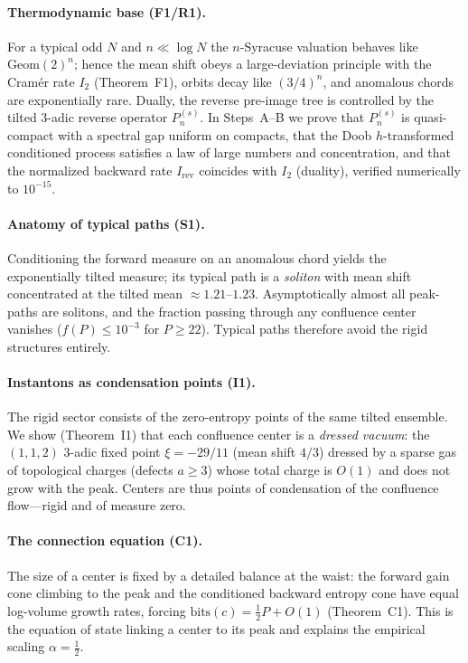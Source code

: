 \documentclass[12pt,a4paper]{article}
\begin{document}
\paragraph{Thermodynamic base (F1/R1).}
For a typical odd $N$ and $n\ll\log N$ the $n$-Syracuse valuation behaves like
$\mathrm{Geom}(2)^n$; hence the mean shift obeys a large-deviation principle
with the Cram\'er rate $I_2$ (Theorem~F1), orbits decay like $(3/4)^n$, and
anomalous chords are exponentially rare. Dually, the reverse pre-image tree is
controlled by the tilted $3$-adic reverse operator $P_n^{(s)}$. In
Steps~A--B we prove that $P_n^{(s)}$ is quasi-compact with a spectral gap
uniform on compacts, that the Doob $h$-transformed conditioned process satisfies
a law of large numbers and concentration, and that the normalized backward rate
$I_{\mathrm{rev}}$ coincides with $I_2$ (duality), verified numerically to
$10^{-15}$.

\paragraph{Anatomy of typical paths (S1).}
Conditioning the forward measure on an anomalous chord yields the exponentially
tilted measure; its typical path is a \emph{soliton} with mean shift
concentrated at the tilted mean $\approx1.21$--$1.23$. Asymptotically almost
all peak-paths are solitons, and the fraction passing through any confluence
center vanishes ($f(P)\le10^{-3}$ for $P\ge22$). Typical paths therefore avoid
the rigid structures entirely.

\paragraph{Instantons as condensation points (I1).}
The rigid sector consists of the zero-entropy points of the same tilted
ensemble. We show (Theorem~I1) that each confluence center is a \emph{dressed
vacuum}: the $(1,1,2)$ $3$-adic fixed point $\xi=-29/11$ (mean shift $4/3$)
dressed by a sparse gas of topological charges (defects $a\ge3$) whose total
charge is $O(1)$ and does not grow with the peak. Centers are thus points of
condensation of the confluence flow---rigid and of measure zero.

\paragraph{The connection equation (C1).}
The size of a center is fixed by a detailed balance at the waist: the forward
gain cone climbing to the peak and the conditioned backward entropy cone have
equal log-volume growth rates, forcing $\mathrm{bits}(c)=\tfrac12 P+O(1)$
(Theorem~C1). This is the equation of state linking a center to its peak and
explains the empirical scaling $\alpha=\tfrac12$.
\end{document}
